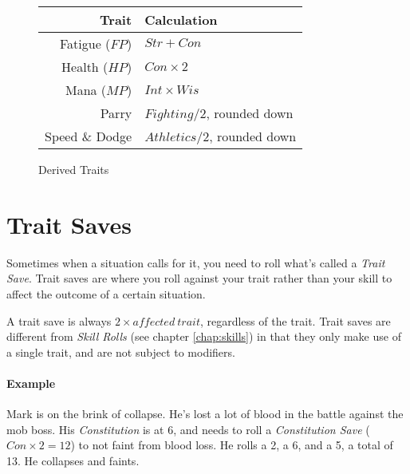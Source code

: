 \begin{figure}[!ht]
    \centering
\begin{tabular}{r | l}
    \textbf{Trait} & \textbf{Calculation} \\\hline
    Fatigue ($FP$) & $Str+Con$ \\
    Health  ($HP$) & $Con\times 2$ \\
    Mana    ($MP$) & $Int\times Wis$ \\
    Parry          & $Fighting/2$, rounded down\\
    Speed \& Dodge & $Athletics / 2$, rounded down\\
\end{tabular}
    \caption{Derived Traits}
    \label{fig:derived_traits}
\end{figure}

\section{Trait Saves}
Sometimes when a situation calls for it, you need to roll what's called a \textit{Trait Save}.
Trait saves are where you roll against your trait rather than your skill to affect the outcome of a certain situation.

A trait save is always $2 \times \mathit{affected\ trait}$, regardless of the trait.
Trait saves are different from \textit{Skill Rolls} (see chapter \ref{chap:skills}) in that they only make use of a single trait, and are not subject to modifiers.

\paragraph{Example} Mark is on the brink of collapse.
He's lost a lot of blood in the battle against the mob boss.
His \textit{Constitution} is at 6, and needs to roll a \textit{Constitution Save} ($Con \times 2 = 12$) to not faint from blood loss.
He rolls a 2, a 6, and a 5, a total of 13. He collapses and faints.
